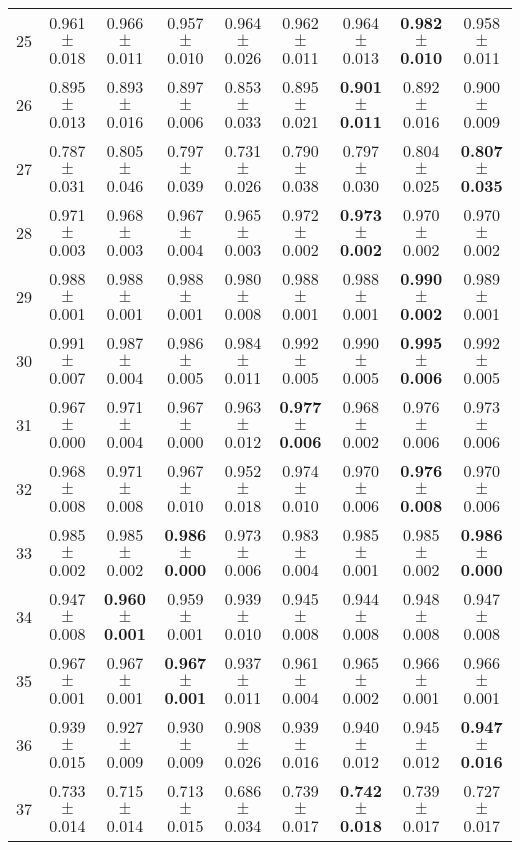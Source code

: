 \begin{table}[!ht]
{\begin{tabular}{r c c c c c c c c}
25 & 0.961 $\pm$ 0.018 & 0.966 $\pm$ 0.011 & 0.957 $\pm$ 0.010 & 0.964 $\pm$ 0.026 & 0.962 $\pm$ 0.011 & 0.964 $\pm$ 0.013 & \textbf{0.982 $\pm$ 0.010} & 0.958 $\pm$ 0.011 \\
26 & 0.895 $\pm$ 0.013 & 0.893 $\pm$ 0.016 & 0.897 $\pm$ 0.006 & 0.853 $\pm$ 0.033 & 0.895 $\pm$ 0.021 & \textbf{0.901 $\pm$ 0.011} & 0.892 $\pm$ 0.016 & 0.900 $\pm$ 0.009 \\
27 & 0.787 $\pm$ 0.031 & 0.805 $\pm$ 0.046 & 0.797 $\pm$ 0.039 & 0.731 $\pm$ 0.026 & 0.790 $\pm$ 0.038 & 0.797 $\pm$ 0.030 & 0.804 $\pm$ 0.025 & \textbf{0.807 $\pm$ 0.035} \\
28 & 0.971 $\pm$ 0.003 & 0.968 $\pm$ 0.003 & 0.967 $\pm$ 0.004 & 0.965 $\pm$ 0.003 & 0.972 $\pm$ 0.002 & \textbf{0.973 $\pm$ 0.002} & 0.970 $\pm$ 0.002 & 0.970 $\pm$ 0.002 \\
29 & 0.988 $\pm$ 0.001 & 0.988 $\pm$ 0.001 & 0.988 $\pm$ 0.001 & 0.980 $\pm$ 0.008 & 0.988 $\pm$ 0.001 & 0.988 $\pm$ 0.001 & \textbf{0.990 $\pm$ 0.002} & 0.989 $\pm$ 0.001 \\
30 & 0.991 $\pm$ 0.007 & 0.987 $\pm$ 0.004 & 0.986 $\pm$ 0.005 & 0.984 $\pm$ 0.011 & 0.992 $\pm$ 0.005 & 0.990 $\pm$ 0.005 & \textbf{0.995 $\pm$ 0.006} & 0.992 $\pm$ 0.005 \\
31 & 0.967 $\pm$ 0.000 & 0.971 $\pm$ 0.004 & 0.967 $\pm$ 0.000 & 0.963 $\pm$ 0.012 & \textbf{0.977 $\pm$ 0.006} & 0.968 $\pm$ 0.002 & 0.976 $\pm$ 0.006 & 0.973 $\pm$ 0.006 \\
32 & 0.968 $\pm$ 0.008 & 0.971 $\pm$ 0.008 & 0.967 $\pm$ 0.010 & 0.952 $\pm$ 0.018 & 0.974 $\pm$ 0.010 & 0.970 $\pm$ 0.006 & \textbf{0.976 $\pm$ 0.008} & 0.970 $\pm$ 0.006 \\
33 & 0.985 $\pm$ 0.002 & 0.985 $\pm$ 0.002 & \textbf{0.986 $\pm$ 0.000} & 0.973 $\pm$ 0.006 & 0.983 $\pm$ 0.004 & 0.985 $\pm$ 0.001 & 0.985 $\pm$ 0.002 & \textbf{0.986 $\pm$ 0.000} \\
34 & 0.947 $\pm$ 0.008 & \textbf{0.960 $\pm$ 0.001} & 0.959 $\pm$ 0.001 & 0.939 $\pm$ 0.010 & 0.945 $\pm$ 0.008 & 0.944 $\pm$ 0.008 & 0.948 $\pm$ 0.008 & 0.947 $\pm$ 0.008 \\
35 & 0.967 $\pm$ 0.001 & 0.967 $\pm$ 0.001 & \textbf{0.967 $\pm$ 0.001} & 0.937 $\pm$ 0.011 & 0.961 $\pm$ 0.004 & 0.965 $\pm$ 0.002 & 0.966 $\pm$ 0.001 & 0.966 $\pm$ 0.001 \\
36 & 0.939 $\pm$ 0.015 & 0.927 $\pm$ 0.009 & 0.930 $\pm$ 0.009 & 0.908 $\pm$ 0.026 & 0.939 $\pm$ 0.016 & 0.940 $\pm$ 0.012 & 0.945 $\pm$ 0.012 & \textbf{0.947 $\pm$ 0.016} \\
37 & 0.733 $\pm$ 0.014 & 0.715 $\pm$ 0.014 & 0.713 $\pm$ 0.015 & 0.686 $\pm$ 0.034 & 0.739 $\pm$ 0.017 & \textbf{0.742 $\pm$ 0.018} & 0.739 $\pm$ 0.017 & 0.727 $\pm$ 0.017 \\

\end{tabular}}
\end{table}
